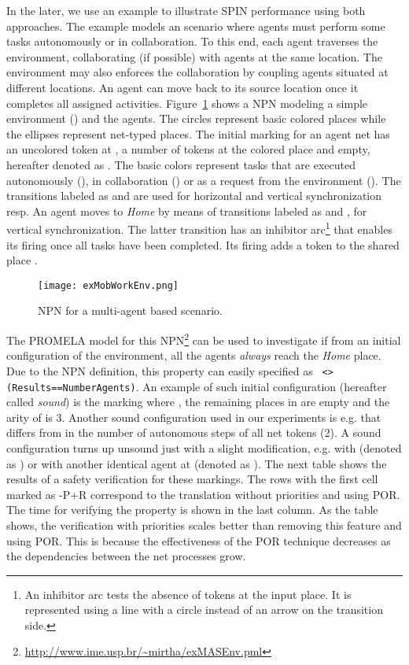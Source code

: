 \documentclass{llncs}
\begin{document}
In the later, we use an example to illustrate SPIN performance using both approaches. The example models an scenario where agents must perform some tasks autonomously or in collaboration. To this end, each agent traverses the environment, collaborating (if possible) with agents at the same location. The environment may also enforces the collaboration by coupling agents situated at different locations. An agent can move back to its source location once it completes all assigned activities. Figure~\ref{figEx1} shows a NPN modeling a simple environment () and the agents. The circles represent basic colored places while the ellipses represent net-typed places. The initial marking for an agent net has an uncolored token at , a number of tokens  at the colored place  and  empty, hereafter denoted as . The basic colors   represent tasks that are executed autonomously (), in collaboration () or as a request from the environment (). The  transitions labeled as  and  are used for horizontal and vertical synchronization resp. An agent moves to \emph{Home} by means of transitions labeled as  and , for vertical synchronization. The latter transition has an inhibitor arc\footnote{An inhibitor arc tests the absence of tokens at the input place.
It is represented using a line with a circle instead of an arrow on the transition side.} that enables its firing once all tasks have been completed. Its firing adds a token to the shared place .

\begin{figure}
\begin{center}
\texttt{[image: exMobWorkEnv.png]}
\end{center}
\vspace{-10pt}
\caption{NPN for a multi-agent based scenario.}
\label{figEx1}
\end{figure}


The PROMELA model for this NPN\footnote{\small\url{http://www.ime.usp.br/~mirtha/exMASEnv.pml}\nfont} can be used to investigate if from an initial configuration of the environment, all the agents \emph{always} reach the \emph{Home} place. Due to the NPN definition, this property can easily specified as \small\verb" <>(Results==NumberAgents)"\nfont. An example of such initial configuration (hereafter called \emph{sound}) is the marking  where  , the remaining places in  are empty and the arity of  is 3. Another sound configuration used in our experiments is e.g.  that differs from  in the number of autonomous steps of all net tokens (2). A sound configuration turns up unsound just with a slight modification, e.g.  with   (denoted as ) or with another identical agent at  (denoted as ). The next table shows the results of a safety verification for these markings. The rows with the first cell marked as -P+R correspond to the translation without priorities and using POR. The time for verifying the property is shown in the last column. As the table shows, the verification with priorities scales better than removing this feature and using POR. This is because the effectiveness of the POR technique decreases as the dependencies between the net processes grow.
\end{document}
